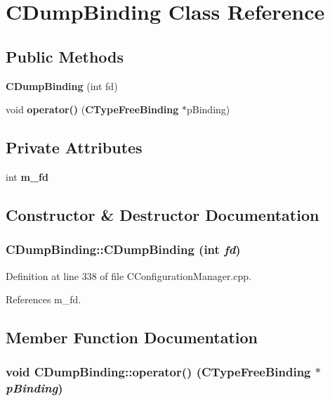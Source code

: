 \section{CDump\-Binding  Class Reference}
\label{classCDumpBinding}
\subsection*{Public Methods}
\begin{CompactItemize}
\item 
{\bf CDump\-Binding} (int fd)
\item 
void {\bf operator()} ({\bf CType\-Free\-Binding} $\ast$p\-Binding)
\end{CompactItemize}
\subsection*{Private Attributes}
\begin{CompactItemize}
\item 
int {\bf m\_\-fd}
\end{CompactItemize}


\subsection{Constructor \& Destructor Documentation}
\subsubsection{\setlength{\rightskip}{0pt plus 5cm}CDump\-Binding::CDump\-Binding (int {\em fd})\hspace{0.3cm}{\tt  [inline]}}\label{classCDumpBinding_a0}




Definition at line 338 of file CConfiguration\-Manager.cpp.

References m\_\-fd.

\subsection{Member Function Documentation}
\subsubsection{\setlength{\rightskip}{0pt plus 5cm}void CDump\-Binding::operator() ({\bf CType\-Free\-Binding} $\ast$ {\em p\-Binding})\hspace{0.3cm}{\tt  [inline]}}\label{classCDumpBinding_a1}




